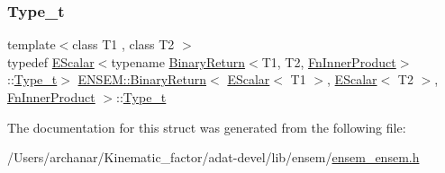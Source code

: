 \subsubsection{\texorpdfstring{Type\_t}{Type\_t}\hspace{0.1cm}{\footnotesize\ttfamily [3/3]}}
{\footnotesize\ttfamily template$<$class T1 , class T2 $>$ \\
typedef \mbox{\hyperlink{classENSEM_1_1EScalar}{E\+Scalar}}$<$typename \mbox{\hyperlink{structENSEM_1_1BinaryReturn}{Binary\+Return}}$<$T1, T2, \mbox{\hyperlink{structENSEM_1_1FnInnerProduct}{Fn\+Inner\+Product}}$>$\+::\mbox{\hyperlink{structENSEM_1_1BinaryReturn_3_01EScalar_3_01T1_01_4_00_01EScalar_3_01T2_01_4_00_01FnInnerProduct_01_4_a873972feeb93fe2dbe766749aba076f1}{Type\+\_\+t}}$>$ \mbox{\hyperlink{structENSEM_1_1BinaryReturn}{E\+N\+S\+E\+M\+::\+Binary\+Return}}$<$ \mbox{\hyperlink{classENSEM_1_1EScalar}{E\+Scalar}}$<$ T1 $>$, \mbox{\hyperlink{classENSEM_1_1EScalar}{E\+Scalar}}$<$ T2 $>$, \mbox{\hyperlink{structENSEM_1_1FnInnerProduct}{Fn\+Inner\+Product}} $>$\+::\mbox{\hyperlink{structENSEM_1_1BinaryReturn_3_01EScalar_3_01T1_01_4_00_01EScalar_3_01T2_01_4_00_01FnInnerProduct_01_4_a873972feeb93fe2dbe766749aba076f1}{Type\+\_\+t}}}



The documentation for this struct was generated from the following file\+:\begin{DoxyCompactItemize}
\item 
/\+Users/archanar/\+Kinematic\+\_\+factor/adat-\/devel/lib/ensem/\mbox{\hyperlink{adat-devel_2lib_2ensem_2ensem__ensem_8h}{ensem\+\_\+ensem.\+h}}\end{DoxyCompactItemize}

